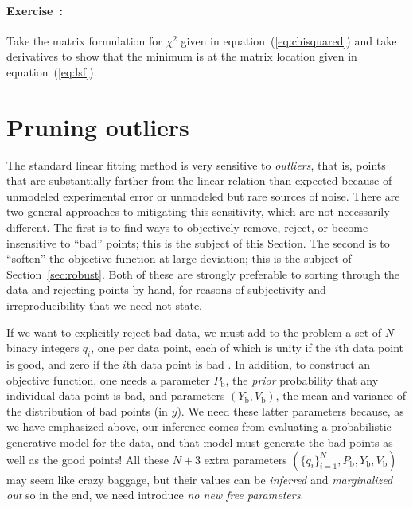 \documentclass[12pt,twoside]{article}
\newcommand{\sectionname}{Section}
\newcommand{\equationname}{equation}
\newcommand{\problemname}{Exercise}
\newcounter{problem}
\newenvironment{problem}{\paragraph{\problemname~\theproblem:}\refstepcounter{problem}}{}
\newcommand{\setofall}[3]{\{{#1}\}_{{#2}}^{{#3}}}
\newcommand{\allq}{\setofall{q_i}{i=1}{N}}
\newcommand{\Pbad}{P_{\mathrm{b}}}
\newcommand{\Ybad}{Y_{\mathrm{b}}}
\newcommand{\Vbad}{V_{\mathrm{b}}}
\begin{document}
\begin{problem}
Take the matrix formulation for $\chi^2$ given in
\equationname~(\ref{eq:chisquared}) and take derivatives to show that
the minimum is at the matrix location given in
\equationname~(\ref{eq:lsf}).
\end{problem}

\section{Pruning outliers}\label{sec:outliers}

The standard linear fitting method is very sensitive to
\emph{outliers}, that is, points that are substantially farther from
the linear relation than expected because of unmodeled experimental
error or unmodeled but rare sources of noise.  There are two general
approaches to mitigating this sensitivity, which are not necessarily
different.  The first is to find ways to objectively remove, reject,
or become insensitive to ``bad'' points; this is the subject of this
\sectionname.  The second is to ``soften'' the objective function at
large deviation; this is the subject of \sectionname~\ref{sec:robust}.
Both of these are strongly preferable to sorting through the data and
rejecting points by hand, for reasons of subjectivity and
irreproducibility that we need not state.

If we want to explicitly reject bad data, we must add to the problem a
set of $N$ binary integers $q_i$, one per data point, each of which is
unity if the $i$th data point is good, and zero if the $i$th data
point is bad \citep{pressH0,jaynes}.  In addition, to construct an
objective function, one needs a parameter $\Pbad$, the \emph{prior}
probability that any individual data point is bad, and parameters
$(\Ybad,\Vbad)$, the mean and variance of the distribution of bad
points (in $y$).  We need these latter parameters because, as we have
emphasized above, our inference comes from evaluating a probabilistic
generative model for the data, and that model must generate the bad
points as well as the good points!  All these $N+3$ extra parameters
$(\allq,\Pbad,\Ybad,\Vbad)$ may seem like crazy baggage, but their
values can be \emph{inferred} and \emph{marginalized out} so in the
end, we need introduce \emph{no new free parameters}.
\end{document}
